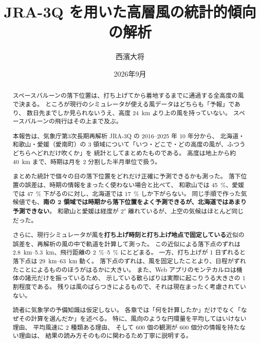 \documentclass[paper=a4, fontsize=10pt, jafontsize=10pt]{jlreq}
\title{JRA-3Q を用いた高層風の統計的傾向の解析}
\author{西濱大将}
\date{2026年9月}
\begin{document}
\maketitle

\begin{abstract}
スペースバルーンの落下位置は、打ち上げてから着地するまでに通過する全高度の風で決まる。
ところが現行のシミュレータが使える風データはどちらも「予報」であり、
数日先までしか見られないうえ、高度 \SI{24}{\kilo\metre} より上の風を持っていない。
スペースバルーンの飛行はその上まで及ぶ。

本報告は、気象庁第3次長期再解析 JRA-3Q の 2016--2025 年 10 年分から、
北海道・和歌山・愛媛（愛南町）の 3 領域について「いつ・どこで・どの高度の風が、ふつうどちらへどれだけ吹くか」を
統計としてまとめたものである。
高度は地上から約 \SI{40}{\kilo\metre} まで、時期は月を 2 分割した半月単位で扱う。

まとめた統計で個々の日の落下位置をどれだけ正確に予測できるかも測った。
落下位置の誤差は、時期の情報をまったく使わない場合と比べて、
和歌山では \SI{45}{\percent}、愛媛では \SI{47}{\percent} 下がるのに対し、北海道では \SI{17}{\percent} しか下がらない。
同じ手順で作った気候値でも、\textbf{南の 2 領域では時期から落下位置をよく予測できるが、北海道ではあまり予測できない}。
和歌山と愛媛は経度が \ang{2} 離れているが、上空の気候はほとんど同じだった。

さらに、現行シミュレータが風を\textbf{打ち上げ時刻と打ち上げ地点で固定している}近似の
誤差を、再解析の風の中で軌道を計算して測った。
この近似による落下点のずれは \SIrange{2.8}{5.3}{\kilo\metre}、飛行距離の
\SIrange{2}{5}{\percent} にとどまる。
一方、打ち上げが 1 日ずれると落下点は \SIrange{29}{63}{\kilo\metre} 動く。
落下点のずれは、風を固定したことより、日程がずれたことによるもののほうがはるかに大きい。
また、Web アプリのモンテカルロは機体の諸元だけを振っているため、
示している散らばりは実際に起こりうる大きさの 1 割程度である。
残りは風のばらつきによるもので、それは現在まったく考慮されていない。

読者に気象学の予備知識は仮定しない。
各章では「何を計算したか」だけでなく「なぜその計算を選んだか」を述べる。
特に、風向のような円環量を平均してはいけない理由、
平均風速に 2 種類ある理由、
そして 600 個の観測が 600 個分の情報を持たない理由は、
結果の読み方そのものに関わるため丁寧に説明する。
\end{abstract}

\tableofcontents
\clearpage















\printbibliography[title={参考文献}]
\end{document}
